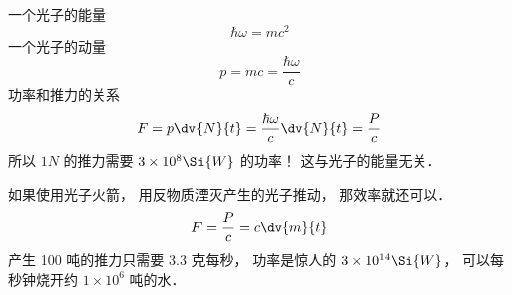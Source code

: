 
一个光子的能量
\begin{equation}
\hbar\omega = mc^2
\end{equation}
一个光子的动量
\begin{equation}
p = mc = \frac{\hbar\omega}{c}
\end{equation}
功率和推力的关系
\begin{equation}
F = p \dv{N}{t} = \frac{\hbar\omega}{c}\dv{N}{t} = \frac{P}{c}
\end{equation}
所以 $1N$ 的推力需要 $3\times 10^8\Si{W}$ 的功率！ 这与光子的能量无关．

如果使用光子火箭， 用反物质湮灭产生的光子推动， 那效率就还可以．
\begin{equation}
F = \frac{P}{c} = c\dv{m}{t}
\end{equation}
产生 100 吨的推力只需要 3.3 克每秒， 功率是惊人的 $3\times 10^{14}\Si{W}$， 可以每秒钟烧开约 $1\times 10^6$ 吨的水．
